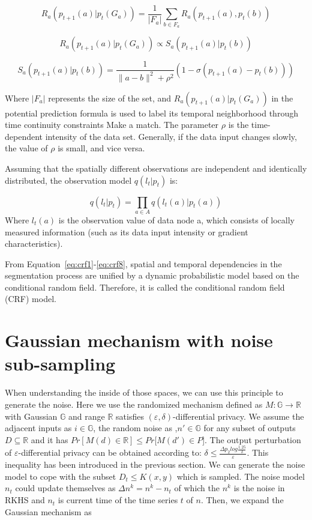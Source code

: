 \documentclass[journal,transmag]{IEEEtran}
\begin{document}
\begin{equation} \label{eq:crf5}
R_a (p_{t+1} (a)|p_t(G_a)) = \frac{1}{|F_a|} \sum_{b \in F_a} R_a (p_{t+1}(a),p_t(b)) 
\end{equation}

\begin{equation} \label{eq:crf6}
R_a (p_{t+1} (a)| p_t(G_a)) \propto S_a (p_{t+1}(a)|p_t(b))
\end{equation}

\begin{equation} \label{eq:crf7}
S_a (p_{t+1}(a)|p_t(b)) = \frac{1}{\parallel a-b \parallel^2 + \rho^2} (1-\sigma(p_{t+1}(a) - p_t (b)))
\end{equation}

Where $|F_a|$  represents the size of the set, and $R_a (p_{t+1} (a)|p_t(G_a))$ in the potential prediction formula is used to label its temporal neighborhood through time continuity constraints Make a match. The parameter $ \rho $ is the time-dependent intensity of the data set. Generally, if the data input changes slowly, the value of $ \rho $ is small, and vice versa.

Assuming that the spatially different observations are independent and identically distributed, the observation model $q(l_t|p_t)$ is:

\begin{equation} \label{eq:crf8}
q(l_t|p_t) = \prod_{a\in A} q(l_t(a)|p_t(a))
\end{equation}
Where $l_t(a)$  is the observation value of data node a, which consists of locally measured information (such as its data input intensity or gradient characteristics).

From Equation~\ref{eq:crf1}-\ref{eq:crf8}, spatial and temporal dependencies in the segmentation process are unified by a dynamic probabilistic model based on the conditional random field. Therefore, it is called the conditional random field (CRF) model\cite{wang2005dynamic}.

\section{Gaussian mechanism with noise sub-sampling}

When understanding the inside of those spaces, we can use this principle to generate the noise. Here we use the randomized mechanism defined as $M:\mathbb{G} \rightarrow \mathbb{R}$  with Gaussian $\mathbb{G}$ and range $\mathbb{R}$ satisfies $(\varepsilon,\delta)$-differential privacy. We assume the adjacent inputs as $i\in \mathbb{G} $, the random noise as ,$n'\in \mathbb{G} $ for any subset of outputs $D \subseteq \mathbb{R}$ and it has $Pr[M(d)\in \mathbb{R}] \leq Pr [M(d')\in P$]. The output perturbation of $\varepsilon$-differential privacy can be obtained according to: $\delta \leq \frac{\Delta p_2 log\frac{1.25}{\delta}}{\varepsilon}$. This inequality has been introduced in the previous section. We can generate the noise model to cope with the subset  $D_t \leq K(x,y)$ which is sampled. The noise model $n_t$ could  update themselves as $\Delta n^k=n^k-n_t $ of which the $n^k$ is the noise in RKHS and $n_t$ is current time of the time series $t$ of $n$. Then, we expand the Gaussian mechanism as 
\end{document}
